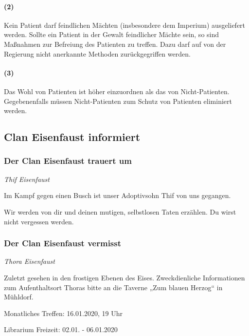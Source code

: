 \documentclass[]{multiversum}
\begin{document}
\paragraph{(2)} Kein Patient darf feindlichen Mächten (insbesondere dem Imperium) ausgeliefert werden. Sollte ein Patient in der Gewalt feindlicher Mächte sein, so sind Maßnahmen zur Befreiung des Patienten zu treffen. Dazu darf auf von der Regierung nicht anerkannte Methoden zurückgegriffen werden.
\paragraph{(3)} Das Wohl von Patienten ist höher einzuordnen als das von Nicht-Patienten. Gegebenenfalls müssen Nicht-Patienten zum Schutz von Patienten eliminiert werden.


\subsection{Clan Eisenfaust informiert}
\subsubsection{Der Clan Eisenfaust trauert um}

\begin{center}
  \textit{Thif Eisenfaust}
\end{center}

Im Kampf gegen einen Busch ist unser Adoptivsohn Thif von uns gegangen.

Wir werden von dir und deinen mutigen, selbstlosen Taten erzählen.
Du wirst nicht vergessen werden.

\subsubsection{Der Clan Eisenfaust vermisst}

\begin{center}
  \textit{Thora Eisenfaust}
\end{center}

Zuletzt gesehen in den frostigen Ebenen des Eises.
Zweckdienliche Informationen zum Aufenthaltsort Thoras bitte an die Taverne „Zum blauen Herzog“ in Mühldorf.




\begin{termine}
  \item Monatliches Treffen: 16.01.2020, 19 Uhr
  \item Librarium Freizeit: 02.01. - 06.01.2020
\end{termine}

\impressum
\end{document}
